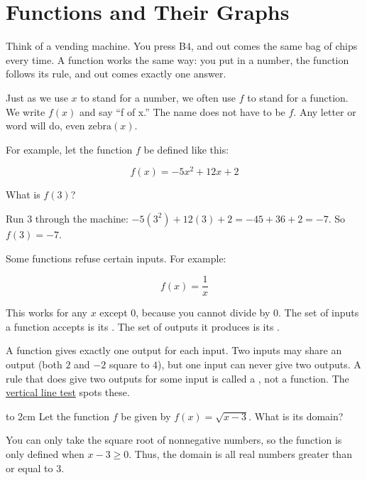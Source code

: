 \chapter{Functions and Their Graphs}

Think of a vending machine. You press B4, and out comes the same bag of
chips every time. A function works the same way: you put in
a number, the function follows its rule, and out comes exactly one answer.

Just as we use $x$ to stand for a number, we often use $f$ to stand for a
function. We write $f(x)$ and say ``f of x.'' The name does not have to be
$f$. Any letter or word will do, even $\mathrm{zebra}(x)$.

For example, let the function $f$ be defined like this:

\begin{equation*}
  f(x) = -5x^2 + 12x + 2
\end{equation*}

What is $f(3)$?

Run 3 through the machine: $-5(3^2) + 12(3) + 2 = -45 + 36 + 2 = -7$. So
$f(3) = -7$.

Some functions refuse certain inputs. For example:

\begin{equation*}
  f(x) = \frac{1}{x}
\end{equation*}

This works for any $x$ except 0, because you cannot divide by 0. The set of
inputs a function accepts is its . The set of
outputs it produces is its .

A function gives exactly one output for each input. Two inputs may share an
output (both $2$ and $-2$ square to $4$), but one input can never give two
outputs. A rule that does give two outputs for some input is called a
, not a function. The
\hyperref[sec:vertical]{vertical line test} spots these.

\begin{Exercise}[title={Domain of a function}, label=function_domain]


  \vspace{2cm}

  \begin{center}
    \vbox to 2cm{\vfil
        Let the function $f$ be given by $f(x) = \sqrt{x - 3}$.  What is its domain?
        \vfil}
  \end{center}
\end{Exercise}
\begin{Answer}[ref=function_domain]
  You can only take the square root of nonnegative numbers, so the
  function is only defined when $x - 3 \geq 0$.  Thus, the domain is
  all real numbers greater than or equal to 3.
\end{Answer}

